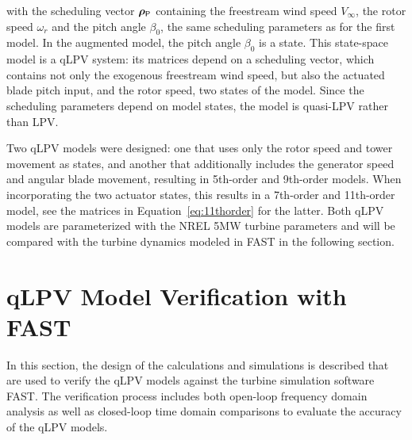     with the scheduling vector $\bm{\rho}_{\mathsf{P}}$ containing the freestream wind speed $V_\infty$, the rotor speed $\omega_r$ and the pitch angle $\beta_0$, the same scheduling parameters as for the first model. In the augmented model, the pitch angle $\beta_0$ is a state. This state-space model is a qLPV system: its matrices depend on a scheduling vector, which contains not only the exogenous freestream wind speed, but also the actuated blade pitch input, and the rotor speed, two states of the model. Since the scheduling parameters depend on model states, the model is quasi-LPV rather than LPV.
    
    Two qLPV models were designed: one that uses only the rotor speed and tower movement as states, and another that additionally includes the generator speed and angular blade movement, resulting in 5th-order and 9th-order models. When incorporating the two actuator states, this results in a 7th-order and 11th-order model, see the matrices in Equation~\eqref{eq:11thorder} for the latter. Both qLPV models are parameterized with the NREL 5MW turbine parameters and will be compared with the turbine dynamics modeled in FAST in the following section.
    \section{qLPV Model Verification with FAST} \label{sec:qLPVModelVerificationwithFAST0} 
    In this section, the design of the calculations and simulations is described that are used to verify the qLPV models against the turbine simulation software FAST. The verification process includes both open-loop frequency domain analysis as well as closed-loop time domain comparisons to evaluate the accuracy of the qLPV models. 

